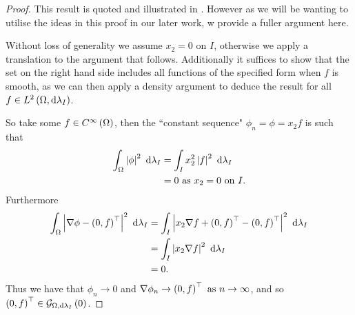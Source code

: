 \begin{proof}
	This result is quoted and illustrated in \cite{zhikov2000extension}.
	However as we will be wanting to utilise the ideas in this proof in our later work, w provide a fuller argument here. \newline

	Without loss of generality we assume $x_2=0$ on $I$, otherwise we apply a translation to the argument that follows.
	Additionally it suffices to show that the set on the right hand side includes all functions of the specified form when $f$ is smooth, as we can then apply a density argument to deduce the result for all $f\in L^{2}\left( \Omega,\mathrm{d}\lambda_I \right)$. \newline
	
	So take some $f\in C^{\infty}\left( \Omega \right)$, then the ``constant sequence" $\phi_n = \phi = x_2 f$ is such that
	\begin{align*}
		\int_{\Omega}\left\lvert \phi \right\rvert^2 \ \mathrm{d}\lambda_I &= \int_{I}x_2^2\left\lvert f \right\rvert^2 \ \mathrm{d}\lambda_I \\
		&= 0 \text{ as } x_2=0 \text{ on } I.
	\end{align*}
	Furthermore
	\begin{align*}
		\int_{\Omega}\left\lvert \nabla\phi - \left( 0, f \right)^\top  \right\rvert^2 \ \mathrm{d}\lambda_I
		&= \int_{I}\left\lvert  x_2\nabla f + \left( 0, f \right)^\top - \left( 0,f \right)^\top  \right\rvert^2 \ \mathrm{d}\lambda_I \\
		&= \int_{I}\left\lvert  x_2\nabla f  \right\rvert^2 \ \mathrm{d}\lambda_I \\
		&= 0.
	\end{align*}
	Thus we have that $\phi_n\rightarrow0$ and $\nabla\phi_n\rightarrow\left( 0,f \right)^\top \ \text{as} \ n \rightarrow\infty$, and so $\left( 0,f \right)^\top\in\mathcal{G}_{ \Omega, \mathrm{d}\lambda_I}\left( 0 \right)$. \newline
	

\end{proof}
